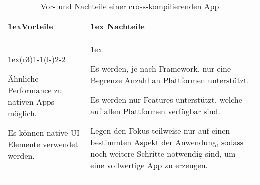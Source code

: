 \begin{table}[h]
	\begin{tabularx}{\linewidth}{>{\parskip1ex}X@{\kern4\tabcolsep}>{\parskip1ex}X}
		\toprule
		\hfil\bfseries Vorteile
		&
		\hfil\bfseries Nachteile
		\\\cmidrule(r{3\tabcolsep}){1-1}\cmidrule(l{-\tabcolsep}){2-2}
		
		Ähnliche Performance zu nativen Apps möglich.\par
		Es können native \ac{UI}-Elemente verwendet werden.\par
		
		&
		
		Es werden, je nach Framework, nur eine Begrenze Anzahl an Plattformen unterstützt.\par
		Es werden nur Features unterstützt, welche auf allen Plattformen verfügbar sind.\par
		Legen den Fokus teilweise nur auf einen bestimmten Aspekt der Anwendung, sodass noch weitere Schritte notwendig sind, um eine vollwertige App zu erzeugen.\par
		\\\bottomrule
	\end{tabularx}
	\caption{Vor- und Nachteile einer cross-kompilierenden App}
\end{table}